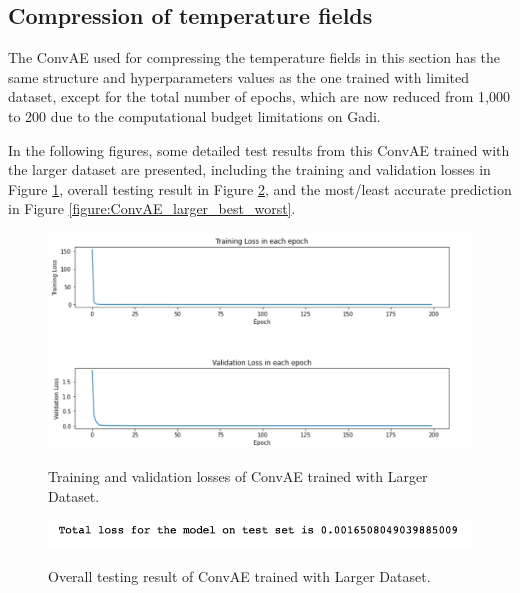 \subsection{Compression of temperature fields}

The ConvAE used for compressing the temperature fields in this section has the same structure and hyperparameters values as the one trained with limited dataset, except for the total number of epochs, which are now reduced from 1,000 to 200 due to the computational budget limitations on Gadi.

In the following figures, some detailed test results from this ConvAE trained with the larger dataset are presented, including the training and validation losses in Figure \ref{figure:ConvAE_larger_losses}, overall testing result in Figure \ref{figure:ConvAE_larger_testing}, and the most/least accurate prediction in Figure \ref{figure:ConvAE_larger_best_worst}.

\begin{figure}[H]
    \caption{Training and validation losses of ConvAE trained with Larger Dataset.}
    \includegraphics[scale=0.6]{figures/mantle_convection_images/larger_dataset/ConvAE_trainingData.png}
    \label{figure:ConvAE_larger_losses}
\end{figure}

\begin{figure}[H]
    \caption{Overall testing result of ConvAE trained with Larger Dataset.}
    \includegraphics[scale=0.8]{figures/mantle_convection_images/larger_dataset/ConvAE_OverallTesting.png}
    \label{figure:ConvAE_larger_testing}
\end{figure}

